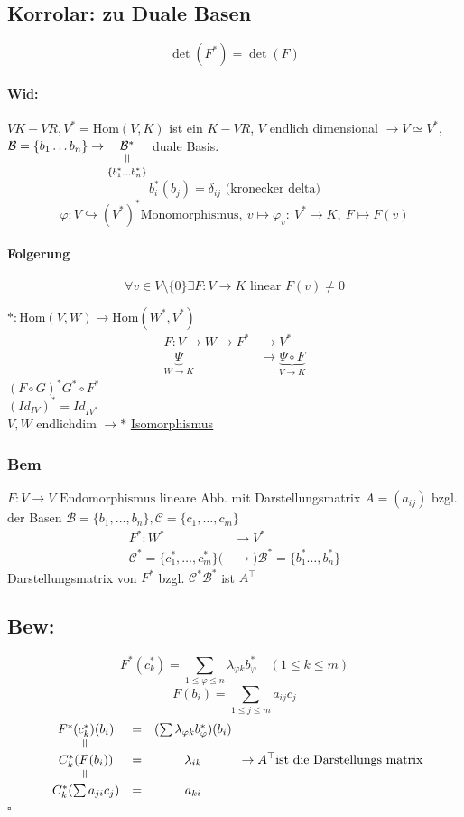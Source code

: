 \documentclass[titlepage,12pt,a4paper,ngerman]{report}
\newenvironment{bew}[1]{\subsection{Bew: #1}}{\hfill$\square$}
\newcommand{\Bew}[2]{\begin{bew}{#1}#2\end{bew}}
\newcommand{\verteq}{\rotatebox{90}{$\,=$}}
\newcommand{\equalto}[2]{\underset{\scriptstyle\overset{\mkern4mu\verteq}{#2}}{#1}}
\newcommand{\tx}[1]{\textrm{#1}}
\newcommand{\ub}[1]{\underbrace{#1}}
\newcommand{\enph}{F: V \to V \textrm{ Endomorphismus}}
\begin{document}
\subsection{Korrolar: zu Duale Basen}
$$ \det(F^*) = \det(F) $$


\paragraph{Wid:}
$V K-VR, V^* = \tx{Hom} (V,K)$ ist ein $K-VR$, $V$ endlich dimensional $\rightarrow V \simeq V^*$, $\mathcal B = \{b_1 \dots b_n\} \rightarrow \equalto{\mathcal{B}^*}{\{b_1^* \dots b_n^*\}}$ duale Basis.
$$b_i^* (b_j) = \delta_{ij} \tx{ (kronecker delta)}$$
$$\varphi: V \hookrightarrow (V^*)^* \tx{Monomorphismus},\ v \mapsto \varphi_v:\ V^* \to K,\ F \mapsto F(v)$$ 
\paragraph{Folgerung}
$$\forall v \in V \setminus \{0\} \exists F: V \to K \tx{ linear } F(v) \neq 0$$

$ * : \tx{Hom}(V,W) \to \tx{Hom}(W^*,V^*) $\\
\begin{align*}
F: V \to W \rightarrow F^* &\to V^* \\
\ub{\Psi}_{W \to K} &\mapsto \ub{ \Psi \circ F}_{ V \to K} 
\end{align*}
$ (F\circ G)^* G^* \circ F^* $\\
$ (Id_{IV})^* = Id_{IV^*} $\\
$ V,W $ endlichdim $ \rightarrow * $ \underline{\underline{Isomorphismus}} 

\subsubsection*{Bem}
$ \enph $ lineare Abb. mit Darstellungsmatrix $ A = (a_{ij}) $ bzgl. der Basen $ \mathcal{B} = \{b_1,\dots ,b_n\} , \mathcal{C}= \{c_1,\dots,c_m\} $\\

\begin{align*}
F^*: W^* &\to V^* \\
\mathcal{C}^* = \{ c^*_1,\dots , c^*_m\} (&\rightarrow) \mathcal{B}^* = \{b^*_1  \dots , b^*_n\} 
\end{align*} 
Darstellungsmatrix von $ F^* $ bzgl. $ \mathcal{C}^* \mathcal{B}^* $ ist $ A^\top $

\Bew{}{
	$$F^* (c_k^*) = \sum _{1\leq \varphi \leq n} \lambda_{\varphi k}b_\varphi^* \quad (1\leq k \leq m)$$
	$$F(b_i) = \sum _{1\leq j \leq m} a_{ij} c_j$$
	$$ \begin{array}{ccc}
	F^* (c_k^*) (b_i) & = &(\sum \lambda_{\varphi k} b_\varphi^*) (b_i)\\
	\rotatebox{90}{=} & &  \\
	C_k^* (F(b_i)) & = & \lambda_{ik}\\
	\rotatebox{90}{=} & & \\
	C_k^*(\sum a_{ji}c_j) & = & a_{ki}
	\end{array} \rightarrow A^\top \tx{ist die Darstellungs matrix}$$
}
\end{document}
